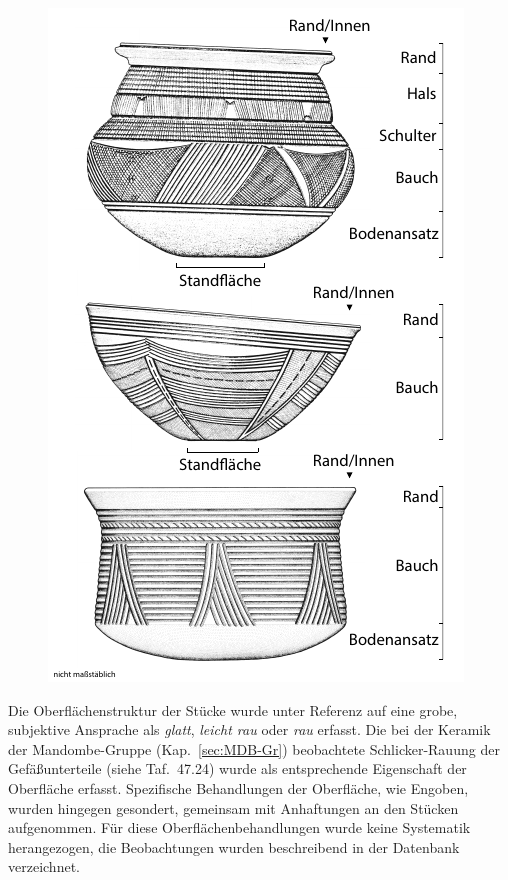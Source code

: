 \begin{multicols}{2}
\begin{figure}[p]
\begin{minipage}[b]{\columnwidth}
		\includegraphics[width=\textwidth]{fig/Keramik_Systematik_Verzierungszonen.pdf}
	\end{minipage}
\end{figure}

Die Oberflächenstruktur der Stücke wurde unter Referenz auf eine grobe, subjektive Ansprache als \textit{glatt}, \textit{leicht rau} oder \textit{rau} erfasst. Die bei der Keramik der Mandombe-Gruppe (Kap.~\ref{sec:MDB-Gr}) beobachtete Schlicker-Rauung der Gefäßunterteile (siehe Taf.~47.24) wurde als entsprechende Eigenschaft der Oberfläche erfasst. Spezifische Behandlungen der Oberfläche, wie Engoben, wurden hingegen gesondert, gemeinsam mit Anhaftungen an den Stücken aufgenommen. Für diese Oberflächenbehandlungen wurde keine Systematik herangezogen, die Beobachtungen wurden beschreibend in der Datenbank verzeichnet.


\end{multicols}
